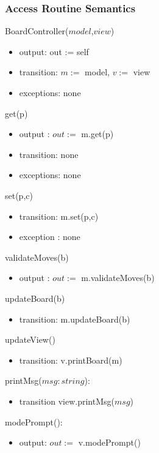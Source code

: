 \documentclass[12pt]{article}
\begin{document}
\subsubsection* {Access Routine Semantics}


\noindent BoardController($model$,$view$)
\begin{itemize} 
\item output: out := self
\item transition: $m:=$ model, $v:=$ view
\item exceptions: none
\end{itemize}

\noindent get(p)
\begin{itemize}
\item output : $out := $ m.get(p)
\item transition: none
\item exceptions: none
\end{itemize}

\noindent set(p,c)
\begin{itemize}
\item transition: m.set(p,c)
\item exception : none
\end{itemize}

\noindent validateMoves(b)
\begin{itemize}
\item output : $out := $ m.validateMoves(b)
\end{itemize}

\noindent updateBoard(b)
\begin{itemize}
\item transition: m.updateBoard(b)
\end{itemize}

\noindent updateView()
\begin{itemize}
\item transition: v.printBoard(m)
\end{itemize}

\noindent printMsg($msg : string$): 
\begin{itemize}
\item transition view.printMsg($msg$)
\end{itemize}


\noindent modePrompt(): 
\begin{itemize}
\item output: $out := $ v.modePrompt()
\end{itemize}
\end{document}
